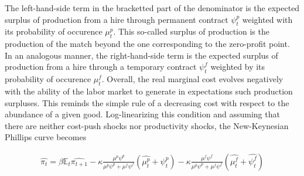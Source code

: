 The left-hand-side term in the bracketted part of the denominator is the expected surplus of production from a hire through permanent contract $\psi_t^p$ weighted with its probability of occurence $\mu_t^p$. This so-called surplus of production is the production of the match beyond the one corresponding to the zero-profit point. In an analogous manner, the right-hand-side term is the expected surplus of production from a hire through a temporary contract $\psi_t^f$ weighted by its probability of occurence $\mu_t^f$. Overall, the real marginal cost evolves negatively with the ability of the labor market to generate in expectations such production surpluses. This reminds the simple rule of a decreasing cost with respect to the abundance of a given good. Log-linearizing this condition and assuming that there are neither cost-push shocks nor productivity shocks, the New-Keynesian Phillips curve becomes

\begin{align*}
\widehat{\pi_t} = \beta \mathbb{E}_t \widehat{\pi_{t+1}} - \kappa \frac{\mu^p \psi^p}{\mu^p \psi^p + \mu^f \psi^f} \left( \widehat{\mu_t^p} + \widehat{\psi_t^p} \right) - \kappa \frac{\mu^f \psi^f}{\mu^p \psi^p + \mu^f \psi^f} \left( \widehat{\mu_t^f} + \widehat{\psi_t^f} \right)
\end{align*}

